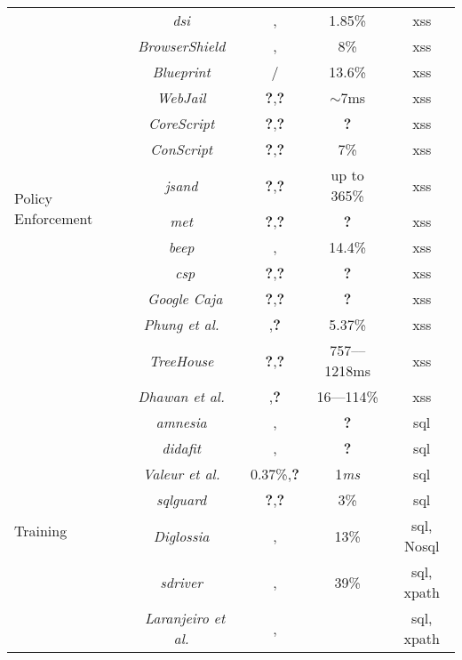 \documentclass[conference]{IEEEtran}
\newcommand{\tick}{\ding{52}}
\newcommand{\xmark}{\ding{56}}
\begin{document}
\begin{table*}
\begin{threeparttable}
\begin{small}
{\begin{tabular}{l|c|cc|c}
	\hline
	\hline    
	\multirow{14}{*}{Policy Enforcement}
	&  {\it {\sc dsi}}~\cite{NSS06} & \xmark,\xmark & 1.85\% & {\sc xss} \\ 
	&  {\it BrowserShield}~\cite{RDWDE07} & \tick,\tick & 8\% & {\sc xss} \\ 
	&  {\it Blueprint}~\cite{LV09} & \tick/\tick & 13.6\% & {\sc xss} \\ 
	&  {\it WebJail}~\cite{VDDPJ11} & {\bf ?},{\bf ?} & $\sim$7ms & {\sc xss} \\ 
	&  {\it CoreScript}~\cite{YCIS07} & {\bf ?},{\bf ?} &  {\bf ?} & {\sc xss} \\ 
	&  {\it ConScript}~\cite{ML10} & {\bf ?},{\bf ?} & 7\% & {\sc xss} \\
	&  {\it {\sc js}and}~\cite{AVBPDP12} & {\bf ?},{\bf ?} & up to 365\% & {\sc xss}\\
	&  {\it {\sc met}}~\cite{ELX07} & {\bf ?},{\bf ?} &  {\bf ?} & {\sc xss} \\ 
    &  {\it {\sc beep}}~\cite{TNH07}  & \tick,\tick & 14.4\% & {\sc xss} \\
	&  {\it {\sc csp}} & {\bf ?},{\bf ?} & {\bf ?} & {\sc xss} \\ 
    &  {\it Google Caja} & {\bf ?},{\bf ?} & {\bf ?} & {\sc xss} \\
    &  {\it Phung et al.}~\cite{PSC09} & \xmark,{\bf ?} & 5.37\% & {\sc xss} \\
    &  {\it TreeHouse}~\cite{IW12} & {\bf ?},{\bf ?} & 757–--1218ms & {\sc xss} \\
    &  {\it Dhawan et al.}~\cite{DSG12} & \xmark,{\bf ?} & 16---114\% & {\sc xss} \\
	\hline
	\hline  
        \multirow{12}{*}{Training}
	&   {\it {\sc amnesia}}~\cite{HO05,HO06,HO05b} & \tick,\tick & {\bf ?} & {\sc sql} \\ 
	&   {\it {\sc didafit}}~\cite{LLW02} & \xmark,\xmark & {\bf ?} & {\sc sql} \\
	&   {\it Valeur et al.}~\cite{VMV05} & 0.37\%,{\bf ?} & 1{\it ms} & {\sc sql} \\
	& 	{\it {\sc sqlg}uard}~\cite{BWS05} & {\bf ?},{\bf ?} & 3\% & {\sc sql} \\
	& 	{\it Diglossia}~\cite{SMS13} & \xmark,\xmark  & 13\% & {\sc sql}, No{\sc sql} \\
	& 	{\it {\sc sd}river}~\cite{MS09,MKS09} & \tick,\tick & 39\% & {\sc sql}, {\sc xp}ath \\
	& 	{\it Laranjeiro et al.}~\cite{LVM09,ALVM09,LVM10} & \xmark,\xmark  & \xmark & {\sc sql}, {\sc xp}ath \\

\end{tabular}}
\end{small}
\end{threeparttable}
\end{table*}
\end{document}
